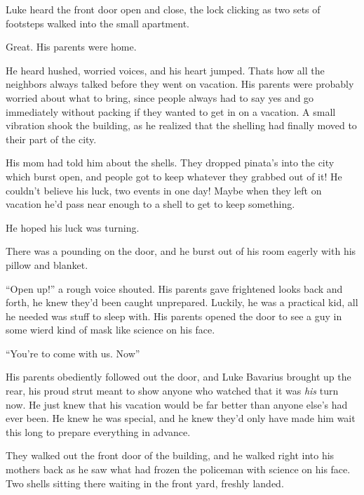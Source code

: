 Luke heard the front door open and close, the lock clicking as two
sets of footsteps walked into the small apartment.



Great. His parents were home.



He heard hushed, worried voices, and his heart jumped. Thats how
all the neighbors always talked before they went on vacation. His
parents were probably worried about what to bring, since people
always had to say yes and go immediately without packing if they
wanted to get in on a vacation. A small vibration shook the
building, as he realized that the shelling had finally moved to
their part of the city.



His mom had told him about the shells. They dropped pinata's into
the city which burst open, and people got to keep whatever they
grabbed out of it! He couldn't believe his luck, two events in one
day! Maybe when they left on vacation he'd pass near enough to a
shell to get to keep something.



He hoped his luck was turning.



There was a pounding on the door, and he burst out of his room
eagerly with his pillow and blanket.



``Open up!'' a rough voice shouted. His parents gave frightened looks
back and forth, he knew they'd been caught unprepared. Luckily, he
was a practical kid, all he needed was stuff to sleep with. His
parents opened the door to see a guy in some wierd kind of mask
like science on his face.



``You're to come with us. Now''



His parents obediently followed out the door, and Luke Bavarius
brought up the rear, his proud strut meant to show anyone who
watched that it was {\em his} turn now. He just knew that his
vacation would be far better than anyone else's had ever been. He
knew he was special, and he knew they'd only have made him wait
this long to prepare everything in advance.



They walked out the front door of the building, and he walked right
into his mothers back as he saw what had frozen the policeman with
science on his face. Two shells sitting there waiting in the front
yard, freshly landed.



